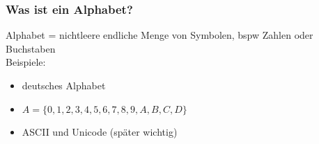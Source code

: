 \documentclass{beamer}
\begin{document}
	\begin{frame}
		\frametitle{Was ist ein Alphabet?}
		Alphabet = nichtleere endliche Menge von Symbolen, bspw Zahlen oder Buchstaben\\
		Beispiele:
		\begin{itemize}
			\item deutsches Alphabet
			\item $A = \{0, 1, 2, 3, 4, 5, 6, 7, 8, 9, A, B, C, D\}$
			\item ASCII und Unicode (später wichtig)
		\end{itemize}
	\end{frame}
\end{document}
